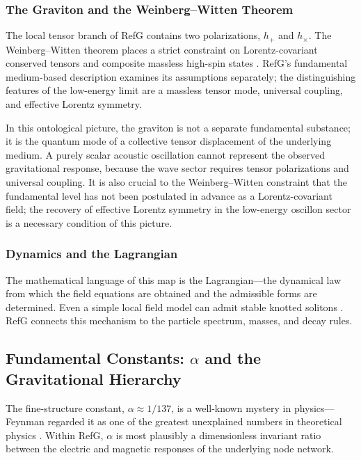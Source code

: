 \documentclass[11pt,a4paper]{article}
\begin{document}
\subsubsection{The Graviton and the Weinberg--Witten Theorem}

The local tensor branch of RefG contains two polarizations, $h_+$ and $h_\times$. The Weinberg--Witten theorem places a strict constraint on Lorentz-covariant conserved tensors and composite massless high-spin states \citep{weinbergwitten1980}. RefG's fundamental medium-based description examines its assumptions separately; the distinguishing features of the low-energy limit are a massless tensor mode, universal coupling, and effective Lorentz symmetry.

In this ontological picture, the graviton is not a separate fundamental substance; it is the quantum mode of a collective tensor displacement of the underlying medium. A purely scalar acoustic oscillation cannot represent the observed gravitational response, because the wave sector requires tensor polarizations and universal coupling. It is also crucial to the Weinberg--Witten constraint that the fundamental level has not been postulated in advance as a Lorentz-covariant field; the recovery of effective Lorentz symmetry in the low-energy oscillon sector is a necessary condition of this picture.

\subsubsection{Dynamics and the Lagrangian}

The mathematical language of this map is the Lagrangian---the dynamical law from which the field equations are obtained and the admissible forms are determined. Even a simple local field model can admit stable knotted solitons \citep{faddeev1997}. RefG connects this mechanism to the particle spectrum, masses, and decay rules.

\subsection{Fundamental Constants: \texorpdfstring{$\alpha$}{alpha} and the Gravitational Hierarchy}

The fine-structure constant, $\alpha\approx1/137$, is a well-known mystery in physics---Feynman regarded it as one of the greatest unexplained numbers in theoretical physics \citep{feynman1985}. Within RefG, $\alpha$ is most plausibly a dimensionless invariant ratio between the electric and magnetic responses of the underlying node network.
\end{document}
